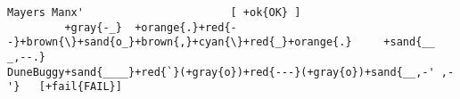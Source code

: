 \documentclass[]{article}
\begin{document}
\begin{Verbatim}[commandchars=+\{\}]
Mayers Manx'                       [ +ok{OK} ]
         +gray{-_}  +orange{.}+red{--}+brown{\}+sand{o_}+brown{,}+cyan{\}+red{_}+orange{.}     +sand{__  _,--.}
DuneBuggy+sand{____}+red{`}(+gray{o})+red{---}(+gray{o})+sand{__,-' ,-'}   [+fail{FAIL}]
\end{Verbatim}
\end{document}
